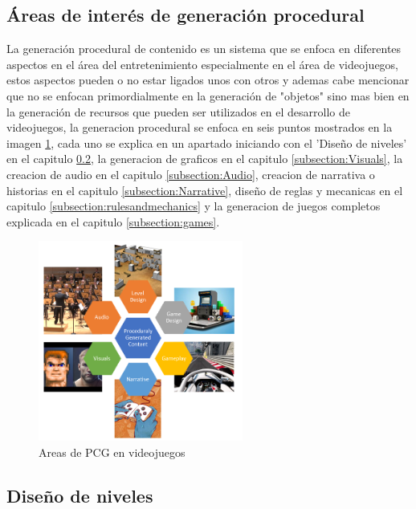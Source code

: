 \subsection{Áreas de interés de generación procedural}
\label{subsection:PCGAreasOfInterest}

La generación procedural de contenido es un sistema que se enfoca en diferentes
aspectos en el área del entretenimiento especialmente en el área de videojuegos,
estos aspectos pueden o no estar ligados unos con otros y ademas cabe mencionar
que no se enfocan primordialmente en la generación de "objetos" sino mas bien en
la generación de recursos que pueden ser utilizados en el desarrollo de
videojuegos, la generacion procedural se enfoca en seis puntos mostrados en la
imagen \ref{figure:pcg_areas}, cada uno se explica en un apartado iniciando con
el 'Diseño de niveles' en el capitulo \ref{subsection:LevelDesign}, la
generacion de graficos en el capitulo \ref{subsection:Visuals}, la creacion de
audio en el capitulo \ref{subsection:Audio}, creacion de narrativa o historias
en el capitulo \ref{subsection:Narrative}, diseño de reglas y mecanicas en el
capitulo \ref{subsection:rulesandmechanics} y la generacion de juegos completos
explicada en el capitulo \ref{subsection:games}.

\begin{figure}
    \centering
    \includegraphics[width=0.6\textwidth]{img/pcg_areas.png}
    \caption{Areas de PCG en videojuegos}
    \label{figure:pcg_areas}
\end{figure}

\subsection{Diseño de niveles}
\label{subsection:LevelDesign}

